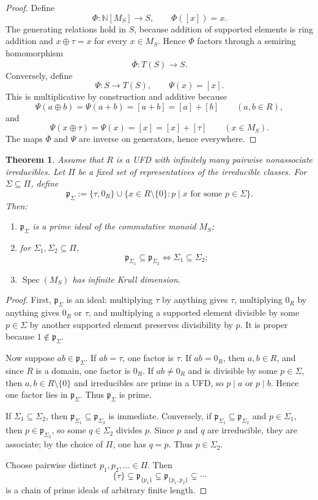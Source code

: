 \documentclass[11pt]{amsart}
\numberwithin{equation}{section}
\newtheorem{theorem}{Theorem}[section]
\theoremstyle{definition}
\newcommand{\Spec}{\operatorname{Spec}}
\begin{document}
\begin{proof}
Define
\[
\Phi:\mathbb N[M_S]\to S,
\qquad
\Phi([x])=x.
\]
The generating relations hold in $S$, because addition of supported elements is ring addition and $x\oplus\tau=x$ for every $x\in M_S$. Hence $\Phi$ factors through a semiring homomorphism
\[
\overline\Phi:T(S)\to S.
\]
Conversely, define
\[
\Psi:S\to T(S),
\qquad
\Psi(x)=[x].
\]
This is multiplicative by construction and additive because
\[
\Psi(a\oplus b)=\Psi(a+b)=[a+b]=[a]+[b]
\qquad(a,b\in R),
\]
and
\[
\Psi(x\oplus\tau)=\Psi(x)=[x]=[x]+[\tau]
\qquad(x\in M_S).
\]
The maps $\overline\Phi$ and $\Psi$ are inverse on generators, hence everywhere. 
\end{proof}

\begin{theorem}\label{thm:monoid-prime-explosion}
Assume that $R$ is a UFD with infinitely many pairwise nonassociate irreducibles. Let $\Pi$ be a fixed set of representatives of the irreducible classes. For $\Sigma\subseteq\Pi$, define
\[
\mathfrak p_\Sigma:=\{\tau,0_R\}\cup
\{x\in R\setminus\{0\}:p\mid x\text{ for some }p\in\Sigma\}.
\]
Then:
\begin{enumerate}[label=(\arabic*)]
    \item $\mathfrak p_\Sigma$ is a prime ideal of the commutative monoid $M_S$;
    \item for $\Sigma_1,\Sigma_2\subseteq\Pi$,
    \[
    \mathfrak p_{\Sigma_1}\subseteq \mathfrak p_{\Sigma_2}
    \iff
    \Sigma_1\subseteq\Sigma_2;
    \]
    \item $\Spec(M_S)$ has infinite Krull dimension.
\end{enumerate}
\end{theorem}

\begin{proof}
First, $\mathfrak p_\Sigma$ is an ideal: multiplying $\tau$ by anything gives $\tau$, multiplying $0_R$ by anything gives $0_R$ or $\tau$, and multiplying a supported element divisible by some $p\in\Sigma$ by another supported element preserves divisibility by $p$. It is proper because $1\notin\mathfrak p_\Sigma$.

Now suppose $ab\in\mathfrak p_\Sigma$. If $ab=\tau$, one factor is $\tau$. If $ab=0_R$, then $a,b\in R$, and since $R$ is a domain, one factor is $0_R$. If $ab\neq0_R$ and is divisible by some $p\in\Sigma$, then $a,b\in R\setminus\{0\}$ and irreducibles are prime in a UFD, so $p\mid a$ or $p\mid b$. Hence one factor lies in $\mathfrak p_\Sigma$. Thus $\mathfrak p_\Sigma$ is prime.

If $\Sigma_1\subseteq\Sigma_2$, then $\mathfrak p_{\Sigma_1}\subseteq\mathfrak p_{\Sigma_2}$ is immediate. Conversely, if $\mathfrak p_{\Sigma_1}\subseteq\mathfrak p_{\Sigma_2}$ and $p\in\Sigma_1$, then $p\in\mathfrak p_{\Sigma_2}$, so some $q\in\Sigma_2$ divides $p$. Since $p$ and $q$ are irreducible, they are associate; by the choice of $\Pi$, one has $q=p$. Thus $p\in\Sigma_2$.

Choose pairwise distinct $p_1,p_2,\dots\in\Pi$. Then
\[
\{\tau\}
\subsetneq
\mathfrak p_{\{p_1\}}
\subsetneq
\mathfrak p_{\{p_1,p_2\}}
\subsetneq\cdots
\]
is a chain of prime ideals of arbitrary finite length. 
\end{proof}
\end{document}
